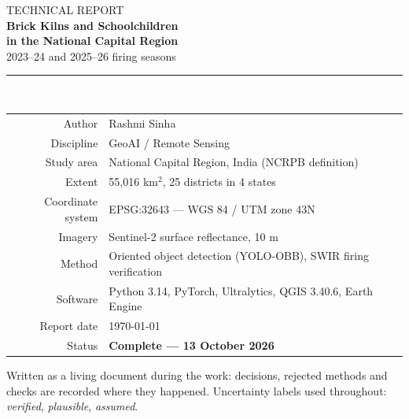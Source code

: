 \documentclass[11pt,a4paper]{article}
\begin{document}
\hypersetup{pageanchor=false}
\begin{titlepage}
\centering
\vspace*{3cm}
{\Large\textcolor{gisgrey}{TECHNICAL REPORT}}\\[6mm]
{\Huge\bfseries Brick Kilns and Schoolchildren\\[2mm] in the National Capital Region}\\[4mm]
{\LARGE 2023--24 and 2025--26 firing seasons}\\[15mm]
\rule{0.7\textwidth}{0.8pt}\\[6mm]
\begin{tabular}{@{}r@{\hspace{6mm}}l@{}}
\textcolor{gisgrey}{Author}            & Rashmi Sinha \\[1.5mm]
\textcolor{gisgrey}{Discipline}        & GeoAI / Remote Sensing \\[1.5mm]
\textcolor{gisgrey}{Study area}        & National Capital Region, India (NCRPB definition) \\[1.5mm]
\textcolor{gisgrey}{Extent}            & 55{,}016 km$^2$, 25 districts in 4 states \\[1.5mm]
\textcolor{gisgrey}{Coordinate system} & EPSG:32643 --- WGS 84 / UTM zone 43N \\[1.5mm]
\textcolor{gisgrey}{Imagery}           & Sentinel-2 surface reflectance, 10 m \\[1.5mm]
\textcolor{gisgrey}{Method}            & Oriented object detection (YOLO-OBB), SWIR firing verification \\[1.5mm]
\textcolor{gisgrey}{Software}          & Python 3.14, PyTorch, Ultralytics, QGIS 3.40.6, Earth Engine \\[1.5mm]
\textcolor{gisgrey}{Report date}       & \today \\[1.5mm]
\textcolor{gisgrey}{Status}            & \textbf{Complete --- 13 October 2026} \\
\end{tabular}
\vfill
{\small\textcolor{gisgrey}{Written as a living document during the work: decisions, rejected methods and
checks are recorded where they happened. Uncertainty labels used throughout:
\emph{verified}, \emph{plausible}, \emph{assumed}.}}
\end{titlepage}
\hypersetup{pageanchor=true}

\tableofcontents
\newpage

\end{document}
